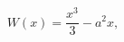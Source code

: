 \begin{equation}
        W(x) = \frac{x^3}{3} - a^2 x,
        \label{eq:supercube}
\end{equation}

